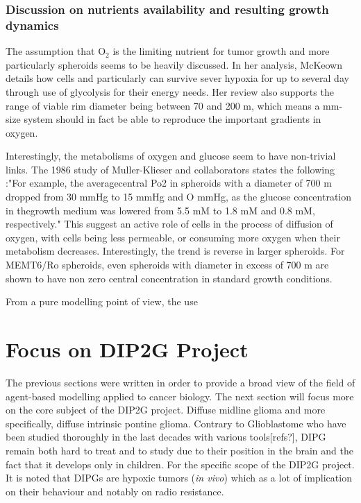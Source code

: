 \documentclass[11pt,a4paper]{article}
\begin{document}


\subsubsection{Discussion on nutrients availability and resulting growth dynamics}
The assumption that O$_2$ is the limiting nutrient for tumor growth and more particularly spheroids seems to be heavily discussed. In her analysis, McKeown details how cells and particularly can survive sever hypoxia for up to several day through use of glycolysis for their energy needs. \cite{McKeown2014} Her review also supports the range of viable rim diameter being between 70 and 200 \textmu m, which means a mm-size system should in fact be able to reproduce the important gradients in oxygen.

Interestingly, the metabolisms of oxygen and glucose seem to have non-trivial links. The 1986 study of Muller-Klieser and collaborators states the following :"For example, the averagecentral Po2 in spheroids with a diameter of 700 \textmu m dropped from 30 mmHg to 15 mmHg and O mmHg, as the glucose concentration in thegrowth medium was lowered from 5.5 mM to 1.8 mM and 0.8 mM, respectively."\cite{MuellerKlieser1986} This suggest an active role of cells in the process of diffusion of oxygen, with cells being less permeable, or consuming more oxygen when their metabolism decreases. Interestingly, the trend is reverse in larger spheroids. For MEMT6/Ro spheroids, even spheroids with diameter in excess of 700 \textmu m are shown to have non zero central concentration in standard growth conditions. 

From a pure modelling point of view, the use

\section{Focus on DIP2G Project}
The previous sections were written in order to provide a broad view of the field of agent-based modelling applied to cancer biology. The next section will focus more on the core subject of the DIP2G project. Diffuse midline glioma and more specifically, diffuse intrinsic pontine glioma. Contrary to Glioblastome who have been studied thoroughly in the last decades with various tools[refs?], DIPG remain both hard to treat and to study due to their position in the brain and the fact that it develops only in children. For the specific scope of the DIP2G project. It is noted that DIPGs are hypoxic tumors (\textit{in vivo}) which as a lot of implication on their behaviour and notably on radio resistance.\cite{Cook2021}
\end{document}
